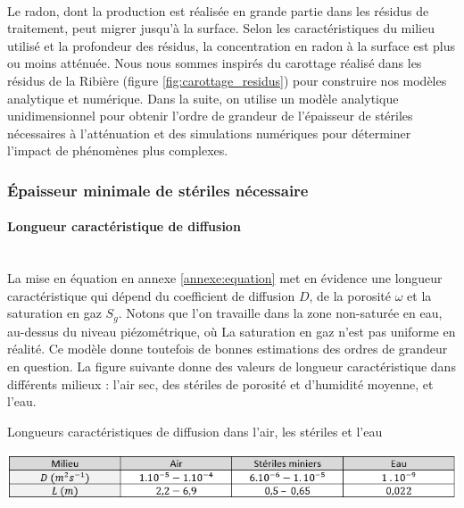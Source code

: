 \documentclass{article}
\begin{document}
\paragraph{} Le radon, dont la production est réalisée en grande partie dans les résidus de traitement, peut migrer jusqu’à la surface. Selon les caractéristiques du milieu utilisé et la profondeur des résidus, la concentration en radon à la surface est plus ou moins atténuée. Nous nous sommes inspirés du carottage réalisé dans les résidus de la Ribière (figure \ref{fig:carottage_residus}) pour construire nos modèles analytique et numérique. Dans la suite, on utilise un modèle analytique unidimensionnel pour obtenir l'ordre de grandeur de l'épaisseur de stériles nécessaires à l'atténuation et des simulations numériques pour déterminer l'impact de phénomènes plus complexes.

\subsubsection{Épaisseur minimale de stériles nécessaire}

\paragraph{Longueur caractéristique de diffusion \\ \\} La mise en équation en annexe \ref{annexe:equation} met en évidence une longueur caractéristique qui dépend du coefficient de diffusion $D$, de la porosité $\omega$ et la saturation en gaz $S_g$. Notons que l’on travaille dans la zone non-saturée en eau, au-dessus du niveau piézométrique, où La saturation en gaz n’est pas uniforme en réalité. Ce modèle donne toutefois de bonnes estimations des ordres de grandeur en question. La figure suivante donne des valeurs de longueur caractéristique dans différents milieux : l'air sec, des stériles de porosité et d'humidité moyenne, et l'eau.

\begin{table}[H]
    \centering
    \caption{Longueurs caractéristiques de diffusion dans l'air, les stériles et l'eau}
    \includegraphics[width = \linewidth]{III_C_2.png}
    \label{tab:longueur_diffusion}
\end{table}
\end{document}
